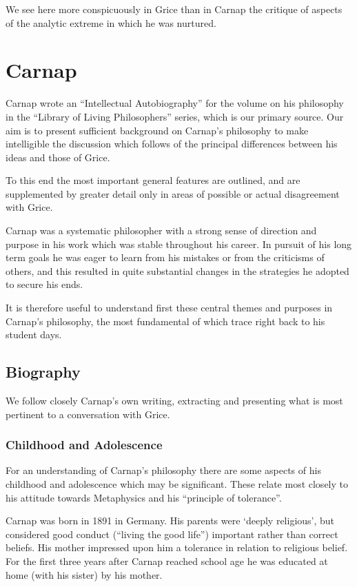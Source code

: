 \documentclass[10pt,titlepage]{book}
\begin{document}
We see here more conspicuously in Grice than in Carnap the critique of aspects of the analytic extreme in which he was nurtured.


\chapter{Carnap}

Carnap wrote an ``Intellectual Autobiography''\cite{carnap63} for the volume on his philosophy\cite{carnap63a} in the ``Library of Living Philosophers'' series, which is our primary source.
Our aim is to present sufficient background on Carnap's philosophy to make intelligible the discussion which follows of the principal differences between his ideas and those of Grice.

To this end the most important general features are outlined, and are supplemented by greater detail only in areas of possible or actual disagreement with Grice.

Carnap was a systematic philosopher with a strong sense of direction and purpose in his work which was stable throughout his career.
In pursuit of his long term goals he was eager to learn from his mistakes or from the criticisms of others, and this resulted in quite substantial changes in the strategies he adopted to secure his ends.

It is therefore useful to understand first these central themes and purposes in Carnap's philosophy, the most fundamental of which trace right back to his student days.

\section{Biography}

We follow closely Carnap's own writing, extracting and presenting what is most pertinent to a conversation with Grice.

\subsection{Childhood and Adolescence}

For an understanding of Carnap's philosophy there are some aspects of his childhood and adolescence which may be significant.
These relate most closely to his attitude towards Metaphysics and his ``principle of tolerance''.

Carnap was born in 1891 in Germany.
His parents were `deeply religious', but considered good conduct (``living the good life'') important rather than correct beliefs.
His mother impressed upon him a tolerance in relation to religious belief.
For the first three years after Carnap reached school age he was educated at home (with his sister) by his mother.
\end{document}
